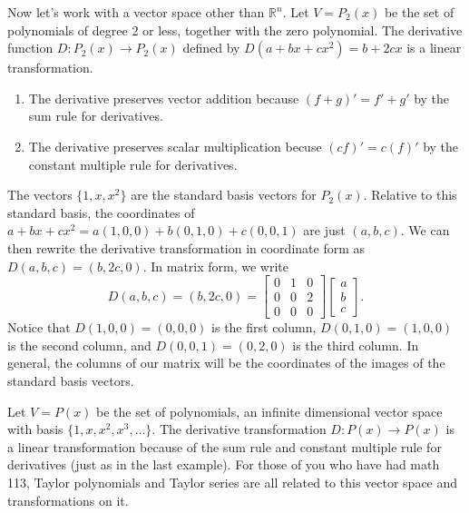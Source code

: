 \begin{example}\label{ltex matrix2}
Now let's work with a vector space other than $\mathbb{R}^n$. 
Let $V=P_2(x)$ be the set of polynomials of degree 2 or less, together with the zero polynomial.  
The derivative function $D:P_2(x)\to P_2(x)$ defined by $D(a+bx+cx^2)=b+2cx$ is a linear transformation. 
\begin{enumerate}
	\item The derivative preserves vector addition because $(f+g)'=f'+g'$ by the sum rule for derivatives.
	\item The derivative preserves scalar multiplication becuse $(cf)'=c(f)'$ by the constant multiple rule for derivatives.
\end{enumerate}
The vectors $\{1,x,x^2\}$ are the standard basis vectors for $P_2(x)$. 
Relative to this standard basis, the coordinates of $a+bx+cx^2 = a(1,0,0)+b(0,1,0)+c(0,0,1)$ are just $(a,b,c)$. 
We can then rewrite the derivative transformation in coordinate form as $D(a,b,c) = (b,2c,0)$. 
In matrix form, we write
 $$D(a,b,c)
 =(b,2c,0)
 =\begin{bmatrix}0&1&0\\0&0&2\\0&0&0\end{bmatrix}\begin{bmatrix}a\\b\\c\end{bmatrix}.$$ 
 Notice that $D(1,0,0)=(0,0,0)$ is the first column, $D(0,1,0)=(1,0,0)$ is the second column, and $D(0,0,1)=(0,2,0)$ is the third column. 
 In general, the columns of our matrix will be the coordinates of the images of the standard basis vectors.
\end{example}

\begin{example}
Let $V=P(x)$ be the set of polynomials, an infinite dimensional vector space with basis $\{1,x,x^2,x^3,\ldots\}$.  
The derivative transformation $D:P(x)\to P(x)$ is a linear transformation because of the sum rule and constant multiple rule for derivatives (just as in the last example). 
For those of you who have had math 113, Taylor polynomials and Taylor series are all related to this vector space and transformations on it.
\end{example}

